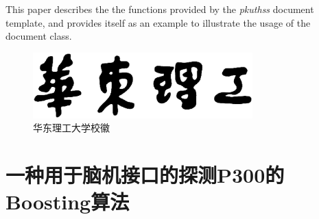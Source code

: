 \documentclass[a4paper, draft]{ecustthss}
\title{\thetitle}
\def\thetitle{一种用于脑机接口的探测P300的Boosting算法}
\begin{document}
  \pagestyle{translation}
  \begin{eabstract}
	This paper describes the the functions provided by
	the \emph{pkuthss} document template,
	and provides itself as an example to illustrate
	the usage of the document class.
  \end{eabstract}
  \begin{figure}
    \includegraphics[height=1in]{img/ecust_words_logo}
    \caption{华东理工大学校徽}
    \label{words_logo}
  \end{figure}
  \section{\thetitle}
\end{document}
